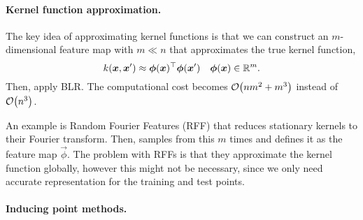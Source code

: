 \paragraph{Kernel function approximation.}

The key idea of approximating kernel functions is that we can construct an
$m$-dimensional feature map with $m \ll n$ that approximates the true kernel
function, \[
  k(\bm{x},\bm{x}')\approx \bm{\phi}(\bm{x})^\top \bm{\phi}(\bm{x}') \hspace{1em} \bm{\phi}(\bm{x})\in\mathbb{R}^m.
\]
Then, apply BLR. The computational cost becomes $\bigo{nm^2 + m^3}$ instead of
$\bigo{n^3}$.

An example is Random Fourier Features (RFF) that reduces stationary kernels to
their Fourier transform. Then, samples from this $m$ times and defines it as
the feature map $\vec{\phi}$. The problem with RFFs is that they approximate
the kernel function globally, however this might not be necessary, since we
only need accurate representation for the training and test points.

\paragraph{Inducing point methods.}

